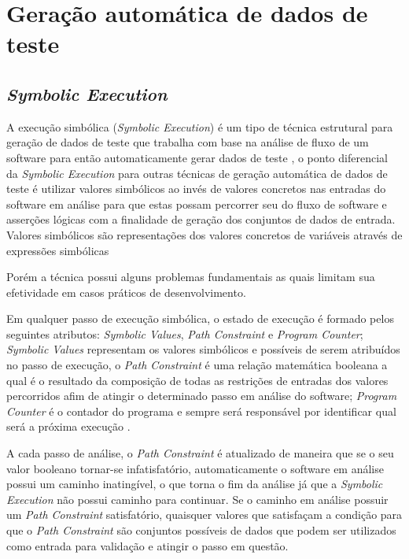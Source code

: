 \documentclass[
	12pt,				%
	oneside,			%
	a4paper,			%
	english,			%
	brazil				%
	]{abntex2ppgsi}
\begin{document}
\chapter{Geração automática de dados de teste}

\section{\textit{Symbolic Execution}}
A execução simbólica (\textit{Symbolic Execution}) é um tipo de técnica estrutural para geração de dados de teste que trabalha com base na análise de fluxo de um software para então automaticamente gerar dados de teste \cite{Anand2013}, o ponto diferencial da \textit{Symbolic Execution} para outras técnicas de geração automática de dados de teste é utilizar valores simbólicos ao invés de valores concretos \cite{King1976} nas entradas do software em análise para que estas possam percorrer seu do fluxo de software e asserções lógicas com a finalidade de geração dos conjuntos de dados de entrada.
Valores simbólicos são representações dos valores concretos de variáveis através de expressões simbólicas \cite{Anand2013}
	 

Porém a técnica possui alguns problemas fundamentais as quais limitam sua efetividade em casos práticos de desenvolvimento.

Em qualquer passo de execução simbólica, o estado de execução é formado pelos seguintes atributos: \textit{Symbolic Values}, \textit{Path Constraint} e  \textit{Program Counter}; \textit{Symbolic Values} representam os valores simbólicos e possíveis de serem atribuídos no passo de execução, o \textit{Path Constraint} é uma relação matemática booleana a qual é o resultado da composição de todas as restrições de entradas dos valores percorridos afim de atingir o determinado passo em análise do software;  \textit{Program Counter} é o contador do programa e sempre será responsável por identificar qual será a próxima execução .

A cada passo de análise, o \textit{Path Constraint} é atualizado de maneira que se o seu valor booleano tornar-se infatisfatório, automaticamente o software em análise possui um caminho inatingível, o que torna o fim da análise já que a \textit{Symbolic Execution} não possui caminho para continuar.
Se o caminho em análise possuir um \textit{Path Constraint} satisfatório, quaisquer valores que satisfaçam a condição para que o \textit{Path Constraint} são conjuntos possíveis de dados que podem ser utilizados como entrada para validação e atingir o passo em questão.
\end{document}

